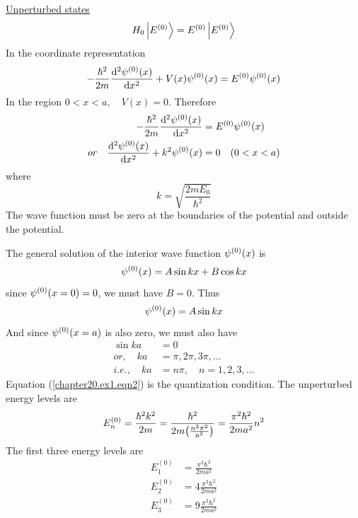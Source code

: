 \begin{enumerate}[label=Problem.\arabic*,start=1]
			\underline{Unperturbed states}
			\begin{equation*}
				H_0 \ket{E^{(0)}} = E^{(0)} \ket{E^{(0)}}
			\end{equation*}
			In the coordinate representation
			\begin{equation*}
				-\frac{\hbar^2}{2 m} \dv[2]{\psi^{(0)}\qty(x)}{x} + V\qty(x) \psi^{(0)}\qty(x) = E^{(0)} \psi^{(0)}\qty(x)
			\end{equation*}
			In the region $0 < x < a,\quad V(x) = 0$. Therefore
			\begin{align}
				-\frac{\hbar^2}{2 m} \dv[2]{\psi^{(0)}\qty(x)}{x} 
				&= E^{(0)} \psi^{(0)}\qty(x) \nonumber\\
		or\quad		\dv[2]{\psi^{(0)}\qty(x)}{x} + k^2 \psi^{(0)}\qty(x) &= 0 \quad (0 < x < a)
			\label{chapter20.ex1.eqn1}
			\end{align}
			where
			\begin{equation*}
				k = \sqrt{\frac{2 m E_0}{\hbar^2}}
			\end{equation*}
			The wave function must be zero at the boundaries of the potential and outside the potential.
			
			The general solution of the interior wave function $\psi^{(0)}\qty(x)$ is
			\begin{equation*}
				\psi^{(0)}\qty(x) = A \sin k x + B \cos k x
			\end{equation*}
			since $\psi^{(0)}\qty(x=0)=0$, we must have $B=0$. Thus
			\begin{equation*}
				\psi^{(0)}\qty(x) = A \sin k x 
			\end{equation*}
			And since $\psi^{(0)}\qty(x=a)$ is also zero, we must also have
			\begin{align}
				\sin k a &= 0 \nonumber\\
				or, \quad k a &= \pi, 2\pi, 3\pi, \ldots \nonumber\\
				i.e.,\quad k a &= n \pi, \quad n = 1,2,3,\ldots
				\label{chapter20.ex1.eqn2}
			\end{align}
			Equation (\ref{chapter20.ex1.eqn2}) is the quantization condition. The unperturbed energy levels are
			\begin{equation}
				E^{(0)}_n = \frac{\hbar^2 k^2}{2 m} = \frac{\hbar^2}{2 m \qty(\frac{n^2 \pi^2}{a^2})} = \frac{\pi^2 \hbar^2}{2 m a^2} n^2
				\label{chapter20.ex1.eqn3}
			\end{equation}
			The first three energy levels are
			\begin{align*}
				E_1^{(0)} &= \frac{\pi^2 \hbar^2}{2 m a^2} \\
				E_2^{(0)} &= 4 \frac{\pi^2 \hbar^2}{2 m a^2} \\
				E_3^{(0)} &= 9 \frac{\pi^2 \hbar^2}{2 m a^2}
			\end{align*}
			

\end{enumerate}
